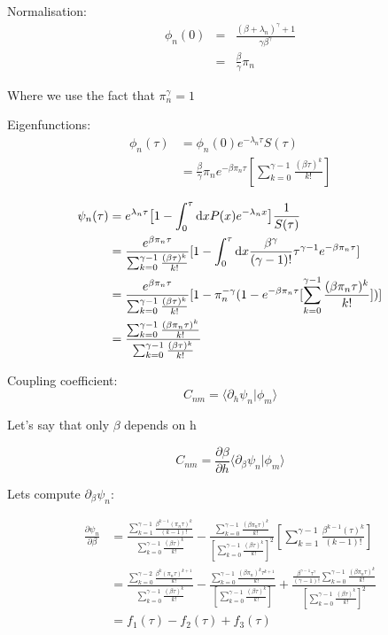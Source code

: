 \documentclass[a4paper,12pt,twoside]{article}
\def \dd  {{\rm d}}
\begin{document}
Normalisation:
\begin{eqnarray}
\phi_n(0)&=&\frac{(\beta+\lambda_n)^\gamma+1}{\gamma\beta^\gamma}\\
&=&\frac{\beta}{\gamma}\pi_n
\end{eqnarray}

Where we use the fact that $\pi_n^\gamma=1$

Eigenfunctions:
\begin{align}
\label{eq:phin}
\phi_n(\tau)&=\phi_n(0)e^{-\lambda_n\tau}S(\tau)\\
&=\frac{\beta}{\gamma}\pi_ne^{-\beta\pi_n\tau}[\sum_{k=0}^{\gamma-1}\frac{(\beta\tau)^k}{k!}]
\end{align}

\begin{align}
\label{eq:psin}
\psi_n(\tau)&=e^{\lambda_n\tau}\big[1-\int^\tau_0 \dd x P(x) e^{-\lambda_nx}\big]\frac{1}{S(\tau)}\\
&=\frac{e^{\beta\pi_n\tau}}{\sum_{k=0}^{\gamma-1}\frac{(\beta\tau)^k}{k!}}[1-\int_0^\tau \dd x \frac{\beta^\gamma}{(\gamma-1)!}\tau^{\gamma-1}e^{-\beta\pi_n\tau}]\\
&=\frac{e^{\beta\pi_n\tau}}{\sum_{k=0}^{\gamma-1}\frac{(\beta\tau)^k}{k!}}[1-\pi_n^{-\gamma}(1-e^{-\beta\pi_n\tau}[\sum_{k=0}^{\gamma-1}\frac{(\beta\pi_n\tau)^k}{k!}])]\\
&=\frac{\sum_{k=0}^{\gamma-1}\frac{(\beta\pi_n\tau)^k}{k!}}{\sum_{k=0}^{\gamma-1}\frac{(\beta\tau)^k}{k!}}
\end{align}


Coupling coefficient:
\begin{equation}
\label{eq:couplingcoef}
C_{nm}=\langle\partial_h\psi_n|\phi_m \rangle 
\end{equation}

Let's say that only $\beta$ depends on h 

\begin{equation}
\label{eq:couplingcoefdb}
C_{nm}=\frac{\partial \beta}{\partial h}\langle\partial_\beta\psi_n|\phi_m \rangle 
\end{equation}

Lets compute $\partial_\beta\psi_n$:

\begin{align}
\label{eq:psindb}
\frac{\partial\psi_n}{\partial \beta}&=\frac{\sum_{k=1}^{\gamma-1}\frac{\beta^{k-1}(\pi_n\tau)^k}{(k-1)!}}{\sum_{k=0}^{\gamma-1}\frac{(\beta\tau)^k}{k!}}-\frac{\sum_{k=0}^{\gamma-1}\frac{(\beta\pi_n\tau)^k}{k!}}{[\sum_{k=0}^{\gamma-1}\frac{(\beta\tau)^k}{k!}]^2}[\sum_{k=1}^{\gamma-1}\frac{\beta^{k-1}(\tau)^k}{(k-1)!}]\\
&=\frac{\sum_{k=0}^{\gamma-2}\frac{\beta^{k}(\pi_n\tau)^{k+1}}{k!}}{\sum_{k=0}^{\gamma-1}\frac{(\beta\tau)^k}{k!}}-\frac{\sum_{k=0}^{\gamma-1}\frac{(\beta\pi_n)^k\tau^{k+1}}{k!}}{[\sum_{k=0}^{\gamma-1}\frac{(\beta\tau)^k}{k!}]}+\frac{\frac{\beta^{\gamma-1}\tau^\gamma}{(\gamma-1)!}\sum_{k=0}^{\gamma-1}\frac{(\beta\pi_n\tau)^k}{k!}}{[\sum_{k=0}^{\gamma-1}\frac{(\beta\tau)^k}{k!}]^2}\\
&=f_1(\tau)-f_2(\tau)+f_3(\tau)
\end{align}
\end{document}

